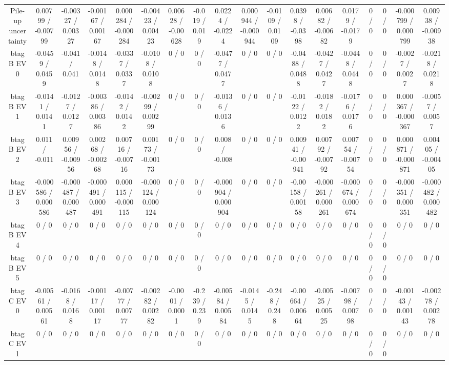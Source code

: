 \documentclass[10pt]{article}
\begin{document}
\begin{table}[htbp]
\begin{center}
\begin{tabular}{|c|c|c|c|c|c|c|c|c|c|c|c|c|c|c|c|c|c|}
  Pile-up uncertainty & 0.00799 / -0.00799 & -0.00327 / 0.00327 & -0.00167 / 0.00167 & 0.000284 / -0.000284 & -0.00423 / 0.00423 & 0.00628 / -0.00628 & -0.019 / 0.019 & 0.0224 / -0.0224 & 0.000944 / -0.000944 & -0.0109 / 0.0109 & 0.0398 / -0.0398 & 0.00682 / -0.00682 & 0.0179 / -0.0179 & 0 / 0 & 0 / 0 & -0.000799 / 0.000799 & 0.00938 / -0.00938 \\ 
  btag B EV 0 & -0.0459 / 0.0459 & -0.041 / 0.041 & -0.0148 / 0.0148 & -0.0337 / 0.0337 & -0.0108 / 0.0108 & 0 / 0 & 0 / 0 & -0.0477 / 0.0477 & 0 / 0 & 0 / 0 & -0.0488 / 0.0488 & -0.0427 / 0.0427 & -0.0448 / 0.0448 & 0 / 0 & 0 / 0 & -0.0027 / 0.0027 & -0.0218 / 0.0218 \\ 
  btag B EV 1 & -0.0141 / 0.0141 & -0.0127 / 0.0127 & -0.00386 / 0.00386 & -0.0142 / 0.0142 & -0.00299 / 0.00299 & 0 / 0 & 0 / 0 & -0.0136 / 0.0136 & 0 / 0 & 0 / 0 & -0.0122 / 0.0122 & -0.0182 / 0.0182 & -0.0176 / 0.0176 & 0 / 0 & 0 / 0 & 0.000367 / -0.000367 & -0.0057 / 0.0057 \\ 
  btag B EV 2 & 0.011 / -0.011 & 0.00956 / -0.00956 & 0.00268 / -0.00268 & 0.00716 / -0.00716 & 0.00173 / -0.00173 & 0 / 0 & 0 / 0 & 0.008 / -0.008 & 0 / 0 & 0 / 0 & 0.00941 / -0.00941 & 0.00792 / -0.00792 & 0.00754 / -0.00754 & 0 / 0 & 0 / 0 & 0.000871 / -0.000871 & 0.00405 / -0.00405 \\ 
  btag B EV 3 & -0.000586 / 0.000586 & -0.000487 / 0.000487 & -0.000491 / 0.000491 & 0.000115 / -0.000115 & -0.000124 / 0.000124 & 0 / 0 & 0 / 0 & -0.000904 / 0.000904 & 0 / 0 & 0 / 0 & -0.00158 / 0.00158 & -0.000261 / 0.000261 & -0.000674 / 0.000674 & 0 / 0 & 0 / 0 & -0.000351 / 0.000351 & -0.000482 / 0.000482 \\ 
  btag B EV 4 & 0 / 0 & 0 / 0 & 0 / 0 & 0 / 0 & 0 / 0 & 0 / 0 & 0 / 0 & 0 / 0 & 0 / 0 & 0 / 0 & 0 / 0 & 0 / 0 & 0 / 0 & 0 / 0 & 0 / 0 & 0 / 0 & 0 / 0 \\ 
  btag B EV 5 & 0 / 0 & 0 / 0 & 0 / 0 & 0 / 0 & 0 / 0 & 0 / 0 & 0 / 0 & 0 / 0 & 0 / 0 & 0 / 0 & 0 / 0 & 0 / 0 & 0 / 0 & 0 / 0 & 0 / 0 & 0 / 0 & 0 / 0 \\ 
  btag C EV 0 & -0.00561 / 0.00561 & -0.0168 / 0.0168 & -0.00117 / 0.00117 & -0.00777 / 0.00777 & -0.00282 / 0.00282 & -0.0001 / 0.0001 & -0.239 / 0.239 & -0.00584 / 0.00584 & -0.0145 / 0.0145 & -0.248 / 0.248 & -0.00664 / 0.00664 & -0.00525 / 0.00525 & -0.00798 / 0.00798 & 0 / 0 & 0 / 0 & -0.00143 / 0.00143 & -0.00278 / 0.00278 \\ 
  btag C EV 1 & 0 / 0 & 0 / 0 & 0 / 0 & 0 / 0 & 0 / 0 & 0 / 0 & 0 / 0 & 0 / 0 & 0 / 0 & 0 / 0 & 0 / 0 & 0 / 0 & 0 / 0 & 0 / 0 & 0 / 0 & 0 / 0 & 0 / 0 \\ 

\end{tabular}
\end{center}
\end{table}
\end{document}
